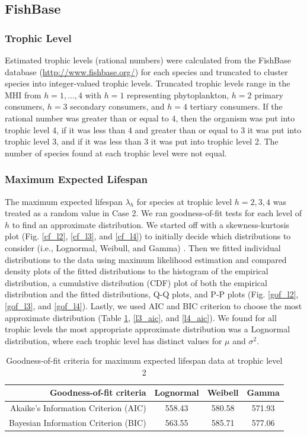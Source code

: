 \documentclass[oneside,12pt,final]{sty/ucthesis-CA2012}
\let\cite\citep                             %
\begin{document}
\begin{mainmatter}
\subsection{FishBase}
\subsubsection{Trophic Level}
Estimated trophic levels (rational numbers) were calculated from the FishBase database (\url{http://www.fishbase.org/}) for each species and truncated to cluster species into integer-valued trophic levels. Truncated trophic levels range in the MHI from $h=1,\dots,4$ with $h=1$ representing phytoplankton, $h=2$ primary consumers, $h=3$ secondary consumers, and $h=4$ tertiary consumers. If the rational number was greater than or equal to 4, then the organism was put into trophic level 4, if it was less than 4 and greater than or equal to 3 it was put into trophic level 3, and if it was less than 3 it was put into trophic level 2. The number of species found at each trophic level were not equal.

\subsubsection{Maximum Expected Lifespan}
The maximum expected lifespan $\lambda_h$ for species at trophic level $h = 2, 3, 4$ was treated as a random value in Case 2. We ran goodness-of-fit tests for each level of $h$ to find an approximate distribution. We started off with a skewness-kurtosis plot (Fig. \ref{cf_l2}, \ref{cf_l3}, and \ref{cf_l4}) to initially decide which distributions to consider (i.e., Lognormal, Weibull, and Gamma) \cite{fitdistrplus}. Then we fitted individual distributions to the data using maximum likelihood estimation and compared density plots of the fitted distributions to the histogram of the empirical distribution, a cumulative distribution (CDF) plot of both the empirical distribution and the fitted distributions, Q-Q plots, and P-P plots (Fig. \ref{gof_l2}, \ref{gof_l3}, and \ref{gof_l4}). Lastly, we used AIC and BIC criterion to choose the most approximate distribution (Table \ref{l2_aic}, \ref{l3_aic}, and \ref{l4_aic}). We found for all trophic levels the most appropriate approximate distribution was a Lognormal distribution, where each trophic level has distinct values for $\mu$ and $\sigma^2$. 

\begin{table}[H]
\centering
\caption{Goodness-of-fit criteria for maximum expected lifespan data at trophic level 2}
\begin{tabular}{r|c|c|c}
  \hline \small
 Goodness-of-fit criteria & Lognormal & Weibell & Gamma \\ 
   \hline
   Akaike's Information Criterion (AIC) & 558.43 & 580.58 & 571.93 \\   
   Bayesian Information Criterion (BIC) & 563.55 & 585.71 & 577.06 \\
   \hline
\end{tabular} 
\label{l2_aic}
\end{table}


\end{mainmatter}
\end{document}
